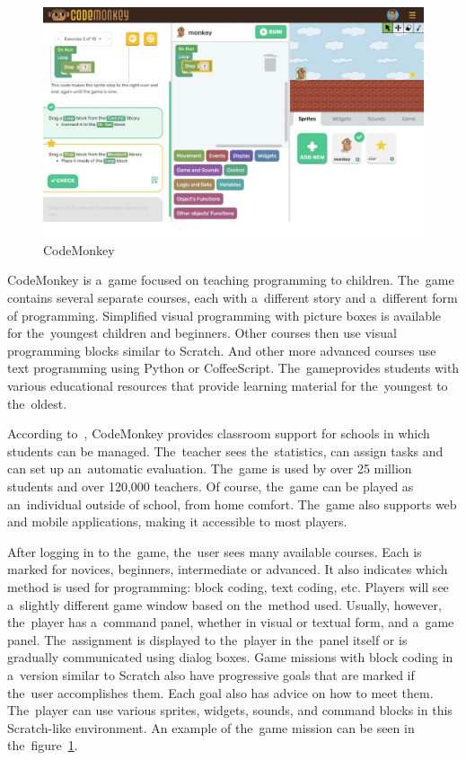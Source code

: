 \begin{figure}
    \centering
    \includegraphics[width=1\linewidth]{assets/similar-games/codemonkey.jpeg}
    \caption{CodeMonkey~\cite{a2020_codemonkey}}
    \label{fig:codemonkey}
\end{figure}

CodeMonkey is a~game focused on teaching programming to children.
\linebreak
The~game contains several separate courses, each with a~different story and a~different form of programming.
Simplified visual programming with \mbox{picture} boxes is available for the~youngest children and beginners.
Other courses then use visual programming blocks similar to Scratch.
And other more \mbox{advanced} courses use text programming using Python or CoffeeScript.
The~game\linebreak{}provides students with various educational resources that provide learning material for the~youngest to the~oldest.

\pagebreak
According to~\cite{a2020_codemonkey}, CodeMonkey provides classroom support for schools in which students can be managed.
The~teacher sees the~statistics, can assign tasks and can set up an~automatic evaluation.
The~game is used by over 25 million students and over 120,000 teachers.
Of course, the~game can be played as an~individual outside of school, from home comfort.
The~game also supports web and mobile applications, making it accessible to most players.

After logging in to the~game, the~user sees many available courses.
Each is marked for novices, beginners, intermediate or advanced.
It also indicates which method is used for programming: block coding, text coding, etc.
Players will see a~slightly different game window based on the~method used.
Usually, however, the~player has a~command panel, whether in visual or textual form, and a~game panel.
The~assignment is displayed to the~player in the~panel itself or is gradually communicated using dialog boxes.
Game missions with block coding in a~version similar to Scratch also have progressive goals that are marked if the~user accomplishes them.
Each goal also has advice on how to meet them.
The~player can use various sprites, widgets, sounds, and command blocks in this Scratch-like environment.
An example of the~game mission can be seen in the~figure~\ref{fig:codemonkey}.

